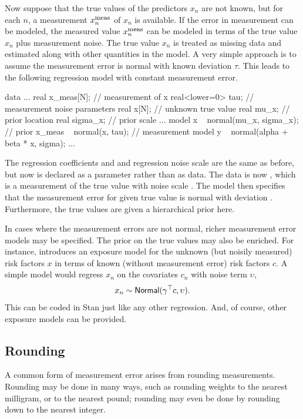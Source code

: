 Now suppose that the true values of the predictors $x_n$ are not
known, but for each $n$, a measurement $x^{\mbox{\footnotesize meas}}_n$ of $x_n$ is available.
If the error in measurement can be modeled, the measured value
$x^{\mbox{\footnotesize meas}}_n$ can be modeled in terms of the true value $x_n$ plus measurement
noise.  The true value $x_n$ is treated as missing data and estimated
along with other quantities in the model.  A very simple approach is
to assume the measurement error is normal with known deviation $\tau$.
This leads to the following regression model with constant measurement
error.
%
\begin{stancode}
data {
  ...
  real x_meas[N];     // measurement of x
  real<lower=0> tau;  // measurement noise
}
parameters {
  real x[N];          // unknown true value
  real mu_x;          // prior location
  real sigma_x;       // prior scale
  ...
}
model {
  x ~ normal(mu_x, sigma_x);  // prior
  x_meas ~ normal(x, tau);    // measurement model
  y ~ normal(alpha + beta * x, sigma);
  ...
}
\end{stancode}
%
The regression coefficients  and  and
regression noise scale  are the same as before, but now
 is declared as a parameter rather than as data.  The data is
now , which is a measurement of the true  value
with noise scale .  The model then specifies that the
measurement error for  given true value 
is normal with deviation .  Furthermore, the true values
 are given a hierarchical prior here.

In cases where the measurement errors are not normal, richer
measurement error models may be specified.  The prior on the true
values may also be enriched.  For instance, \citep{Clayton:1992}
introduces an exposure model for the unknown (but noisily measured)
risk factors $x$ in terms of known (without measurement error) risk
factors $c$.  A simple model would regress $x_n$ on the covariates
$c_n$ with noise term $\upsilon$,
\[
x_n \sim \mbox{\sf Normal}(\gamma^{\top}c, \upsilon).
\]
This can be coded in Stan just like any other regression.  And, of
course, other exposure models can be provided.


\subsection{Rounding}

A common form of measurement error arises from rounding measurements.
Rounding may be done in many ways, such as rounding weights to the
nearest milligram, or to the nearest pound; rounding may even be done
by rounding down to the nearest integer.

